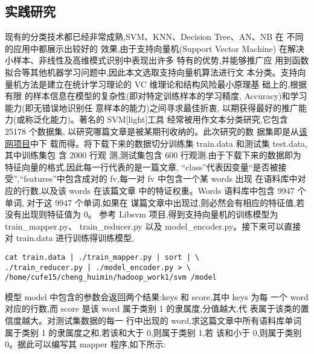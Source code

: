 \subsection{实践研究}\label{ux5b9eux8df5ux7814ux7a76}

现有的分类技术都已经非常成熟,SVM、KNN、Decision Tree、AN、NB 在
不同的应用中都展示出较好的 效果,由于支持向量机(Support Vector Machine)
在解决小样本、非线性及高维模式识别中表现出许多 特有的优势,并能够推广应
用到函数拟合等其他机器学习问题中,因此本文选取支持向量机算法进行文
本分类。支持向量机方法是建立在统计学习理论的 VC
维理论和结构风险最小原理基 础上的,根据有限
的样本信息在模型的复杂性(即对特定训练样本的学习精度,
Accuracy)和学习能力(即无错误地识别任 意样本的能力)之间寻求最佳折衷,
以期获得最好的推广能力(或称泛化能力)。著名的 SVM{[}light{]}工具
经常被用作文本分类研究,它包含 25178 个数据集,
以研究哪篇文章是被某期刊收纳的。此次研究的数
据集即是从\href{http://download.joachims.org/svm_light/examples/example1.tar.gz}{该网项目}中下
载而得。将下载下来的数据切分训练集 train.data 和测试集
test.data,其中训练集包 含 2000 行观 测,测试集包含 600
行观测.由于下载下来的数据即为特征向量的格式,因此每一行代表的是一篇文章,
``class''代表因变量``是否被接受'',``features''中包含成对的 fv,每一对 fv
中包含一个某 words 出现 在语料库中对应的行数,以及该 words 在该篇文章
中的特证权重。Words 语料库中包含 9947 个单词, 对于这 9947 个单词,如果在
谋篇文章中出现过,则必然会有相应的特征值,若没有出现则特征值为 0。 参考
Libsvm 项目,得到支持向量机的训练模型为 train\_mapper.py、
train\_reducer.py 以及 model\_encoder.py。接下来可以直接对 train.data
进行训练得训练模型,

\begin{lstlisting}
cat train.data | ./train_mapper.py | sort | \
./train_reducer.py | ./model_encoder.py > \
/home/cufe15/cheng_huimin/hadoop_work1/svm /model
\end{lstlisting}

模型 model 中包含的参数会返回两个结果:keys 和 score,其中 keys 为每 一个
word 对应的行数,而 score 是该 word 属于类别 1 的隶属度,分值越大,代
表属于该类的置信度越大。对测试集数据的每一 行中出现的
word,求这篇文章中所有语料库单词属于类别 1 的隶属度之和,若该和大于
0,则属于类别 1,若 该和小于 0,则属于类别 0。据此可以编写其 mapper
程序,如下所示:


